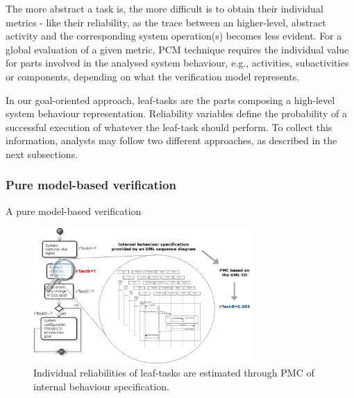 

The more abstract a task is, the more difficult is to 
obtain their individual metrics - like their reliability, as the trace between an higher-level, abstract activity and the corresponding system operation(s) becomes less evident. For a global evaluation of a given metric, PCM technique requires the individual value for parts involved in the analysed system behaviour, e.g., activities, subactivities or components, depending on what the verification model represents.

In our goal-oriented approach, leaf-tasks are the parts composing a high-level system behaviour representation. Reliability variables define the probability of a successful execution of whatever the leaf-task should perform. To collect this information, analysts may follow two different approaches, as described in the next subsections. 

\subsubsection{Pure model-based verification}

A pure model-based verification 

\begin{figure}[ht!]
\centering
\includegraphics[width=0.75\textwidth]{imgs/MD_PMC.png}
\caption{Individual reliabilities of leaf-tasks are estimated through PMC of internal behaviour specification.}
\label{fig:MD_PMC}
\end{figure}



